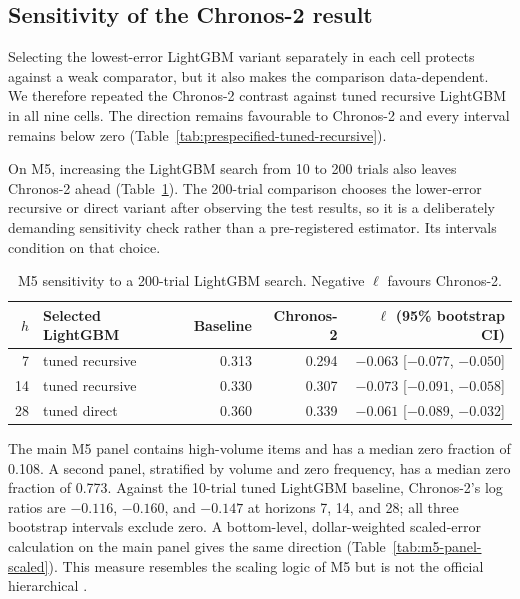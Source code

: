 \subsection{Sensitivity of the Chronos-2 result}

Selecting the lowest-error LightGBM variant separately in each cell protects
against a weak comparator, but it also makes the comparison data-dependent.
We therefore repeated the Chronos-2 contrast against tuned recursive LightGBM
in all nine cells. The direction remains favourable to Chronos-2 and every
interval remains below zero (Table~\ref{tab:prespecified-tuned-recursive}).

\begin{table}[htbp]
\centering
\caption{Chronos-2 compared with the same prespecified baseline, tuned
recursive LightGBM, in every dataset--horizon cell.}
\label{tab:prespecified-tuned-recursive}
\small

\end{table}

On M5, increasing the LightGBM search from 10 to 200 trials also leaves
Chronos-2 ahead (Table~\ref{tab:m5-200trial}). The 200-trial comparison chooses
the lower-error recursive or direct variant after observing the test results,
so it is a deliberately demanding sensitivity check rather than a
pre-registered estimator. Its intervals condition on that choice.

\begin{table}[htbp]
\centering
\caption{M5 sensitivity to a 200-trial LightGBM search. Negative $\ell$
favours Chronos-2.}
\label{tab:m5-200trial}
\small
\begin{tabular}{rlrrr}
\toprule
$h$ & Selected LightGBM & Baseline \WAPE{} & Chronos-2 \WAPE{} &
$\ell$ (95\% bootstrap CI) \\
\midrule
7 & tuned recursive & 0.313 & 0.294 & $-0.063$ [$-0.077$, $-0.050$] \\
14 & tuned recursive & 0.330 & 0.307 & $-0.073$ [$-0.091$, $-0.058$] \\
28 & tuned direct & 0.360 & 0.339 & $-0.061$ [$-0.089$, $-0.032$] \\
\bottomrule
\end{tabular}
\end{table}

The main M5 panel contains high-volume items and has a median zero fraction of
0.108. A second panel, stratified by volume and zero frequency, has a median
zero fraction of 0.773. Against the 10-trial tuned LightGBM baseline,
Chronos-2's log ratios are $-0.116$, $-0.160$, and $-0.147$ at horizons 7,
14, and 28; all three bootstrap intervals exclude zero. A bottom-level,
dollar-weighted scaled-error calculation on the main panel gives the same
direction (Table~\ref{tab:m5-panel-scaled}). This measure resembles the
scaling logic of M5 but is not the official hierarchical \WRMSSE{}.

